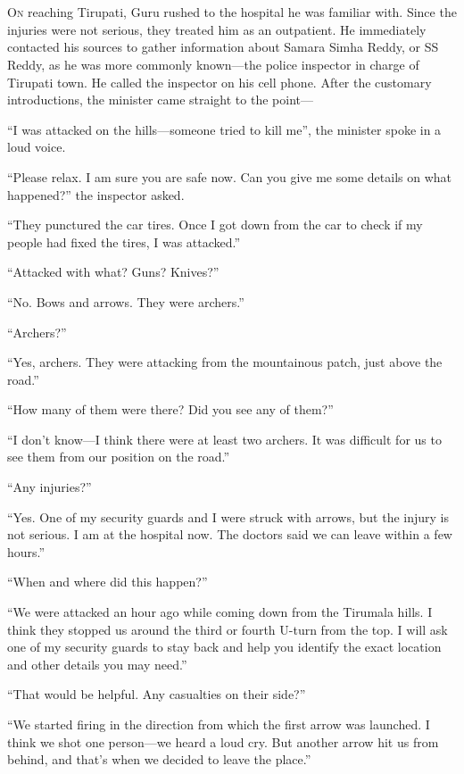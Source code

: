 \chapter{}

\lettrine{O}{n} reaching Tirupati, Guru rushed to the hospital he was familiar
with. Since the injuries were not serious, they treated him as an outpatient. He
immediately contacted his sources to gather information about Samara Simha Reddy, or SS
Reddy, as he was more commonly known—the police inspector in charge of Tirupati
town. He called the inspector on his cell phone. After the customary
introductions, the minister came straight to the point—

“I was attacked on the hills—someone tried to kill me”, the minister spoke in
a loud voice.

“Please relax. I am sure you are safe now. Can you give me some details on what
happened?” the inspector asked.

“They punctured the car tires. Once I got down from the car to check if my
people had fixed the tires, I was attacked.”

“Attacked with what? Guns? Knives?”

“No. Bows and arrows. They were archers.”

“Archers?”

“Yes, archers. They were attacking from the mountainous patch, just above the
road.”

“How many of them were there? Did you see any of them?”

“I don't know—I think there were at least two archers. It was difficult for us
to see them from our position on the road.”

“Any injuries?”

“Yes. One of my security guards and I were struck with arrows, but the injury is
not serious. I am at the hospital now. The doctors said we can leave within a
few hours.”

“When and where did this happen?”

“We were attacked an hour ago while coming down from the Tirumala hills. I
think they stopped us around the third or fourth U-turn from the top. I will ask
one of my security guards to stay back and help you identify the exact location
and other details you may need.”

“That would be helpful. Any casualties on their side?”

“We started firing in the direction from which the first arrow was launched. I
think we shot one person—we heard a loud cry. But another arrow hit us from
behind, and that's when we decided to leave the place.”


